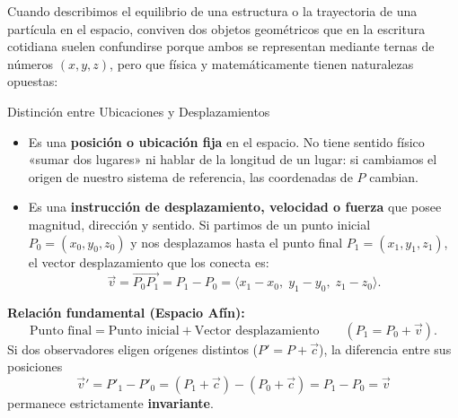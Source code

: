 \documentclass[11pt,letterpaper]{article}
\begin{document}
\setlength{\abovedisplayskip}{6pt}
\setlength{\belowdisplayskip}{6pt}
\setlength{\textfloatsep}{10pt}
\setlength{\intextsep}{8pt}
\color{blackmain}



Cuando describimos el equilibrio de una estructura o la trayectoria de una partícula en el espacio, conviven dos objetos geométricos que en la escritura cotidiana suelen confundirse porque ambos se representan mediante ternas de números $(x, y, z)$, pero que física y matemáticamente tienen naturalezas opuestas:

\begin{intuitionbox}{Distinción entre Ubicaciones y Desplazamientos}
\begin{itemize}
    \item {} Es una \textbf{posición o ubicación fija} en el espacio. No tiene sentido físico «sumar dos lugares» ni hablar de la longitud de un lugar: si cambiamos el origen de nuestro sistema de referencia, las coordenadas de $P$ cambian.
    \item {} Es una \textbf{instrucción de desplazamiento, velocidad o fuerza} que posee magnitud, dirección y sentido. Si partimos de un punto inicial $P_0 = (x_0, y_0, z_0)$ y nos desplazamos hasta el punto final $P_1 = (x_1, y_1, z_1)$, el vector desplazamiento que los conecta es:
    \[
    \vec{v} = \overrightarrow{P_0 P_1} = P_1 - P_0 = \langle x_1 - x_0,\; y_1 - y_0,\; z_1 - z_0 \rangle.
    \]
\end{itemize}
\textbf{Relación fundamental (Espacio Afín):}
\[
\text{Punto final} = \text{Punto inicial} + \text{Vector desplazamiento} \qquad (P_1 = P_0 + \vec{v}).
\]
Si dos observadores eligen orígenes distintos ($P' = P + \vec{c}$), la diferencia entre sus posiciones
\[
\vec{v}' = P'_1 - P'_0 = (P_1 + \vec{c}) - (P_0 + \vec{c}) = P_1 - P_0 = \vec{v}
\]
permanece estrictamente \textbf{invariante}.
\end{intuitionbox}
\end{document}

